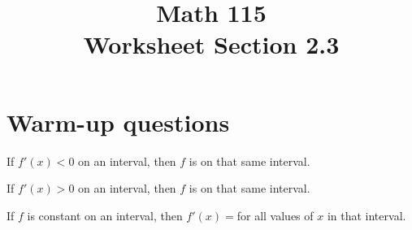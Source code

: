 \documentclass[11pt]{exam}
\title{\vspace{-0.5in} Math 115 \\ Worksheet Section 2.3}
\date{}
\begin{document}
\maketitle
\vspace{-0.75in}
\section*{Warm-up questions}

\noindent
If $f'(x)<0$ on an interval, then $f$ is \fillin[decreasing] on that same interval.

\noindent
If $f'(x)>0$ on an interval, then $f$ is \fillin[increasing] on that same interval.

\noindent
If $f$ is constant on an interval, then $f'(x) =$\fillin[\(0\)] for all values of $x$ in that interval.
\end{document}

